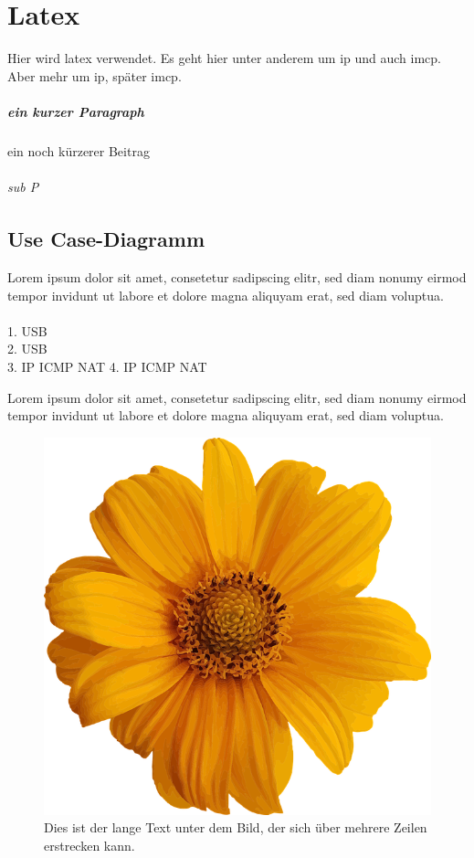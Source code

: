 \chapter{Latex} 
Hier wird \gls{latex} verwendet. Es geht hier unter anderem um \gls{ip} und auch \gls{imcp}.
Aber mehr um \gls{ip}, später \gls{imcp}. 
\paragraph{ein kurzer Paragraph}
ein noch kürzerer Beitrag
\subparagraph{sub P}

\section{Use Case-Diagramm}
\cite{sigfridsson,wordnet}
Lorem ipsum dolor sit amet, consetetur sadipscing elitr, sed diam nonumy eirmod tempor invidunt ut labore et dolore magna aliquyam erat, sed diam voluptua. \\
\\
1. \ac{USB} \\
2. \ac{USB} \\
3. \ac{IP} \ac{ICMP} \ac{NAT}
4. \ac{IP} \ac{ICMP} \ac{NAT}

Lorem ipsum dolor sit amet, consetetur sadipscing elitr, sed diam nonumy eirmod tempor invidunt ut labore et dolore magna aliquyam erat, sed diam voluptua. 

\begin{figure}[htb]
	\centering
	\includegraphics[scale=0.2,]{img/sample-logo.png}
	\caption[Dies ist der kurze Text im Abb Verzeichnis]{Dies ist der lange Text unter dem Bild, der sich über mehrere Zeilen erstrecken kann.}
	\label{fig:my_label}
\end{figure}